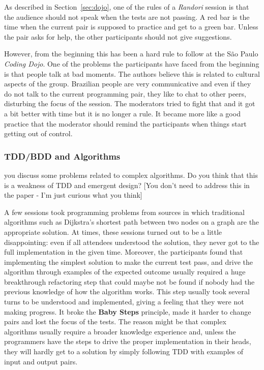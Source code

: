 As described in Section~\ref{sec:dojo}, one of the rules of a
\emph{Randori} session is that the audience should not speak when
the tests are not passing. A red bar is the time when the current
pair is supposed to practice and get to a green bar. Unless the pair
asks for help, the other participants should not give suggestions.

However, from the beginning this has been a hard rule to follow at
the São Paulo \emph{Coding Dojo}. One of the problems the participants
have faced from the beginning is that people talk at bad moments. The authors
believe this is related to cultural aspects of the group. Brazilian people are
very communicative and even if they do not talk to the current programming
pair, they like to chat to other peers, disturbing the focus of the session.
The moderators tried to fight that and it got a bit better with time but it is no
longer a rule. It became more like a good practice that the moderator should
remind the participants when things start getting out of control.

\subsubsection{TDD/BDD and Algorithms}

{\Large you discuss some problems related to complex algorithms. Do you
  think that this is a weakness of TDD and emergent design? [You don't
  need to address this in the paper - I'm just curious what you
  think]}

A few sessions took programming problems from sources in which
traditional algorithms such as Dijkstra's shortest path between two
nodes on a graph are the appropriate solution. At times,
these sessions turned out to be a little disappointing: even if all attendees
understood the solution, they never got to the full implementation in the given
time. Moreover, the participants found that implementing the simplest solution
to make the current test pass, and drive the algorithm through examples of the
expected outcome usually required a huge breakthrough refactoring step that could
maybe not be found if nobody had the previous knowledge of how the
algorithm works. This step usually took several turns to be understood and implemented,
giving a feeling that they were not making progress. It broke the \textbf{Baby Steps}
principle, made it harder to change pairs and lost the focus of the tests.
The reason might be that complex algorithms usually require a broader knowledge
experience and, unless the programmers have the steps to drive the proper implementation
in their heads, they will hardly get to a solution by simply following TDD with examples
of input and output pairs.

